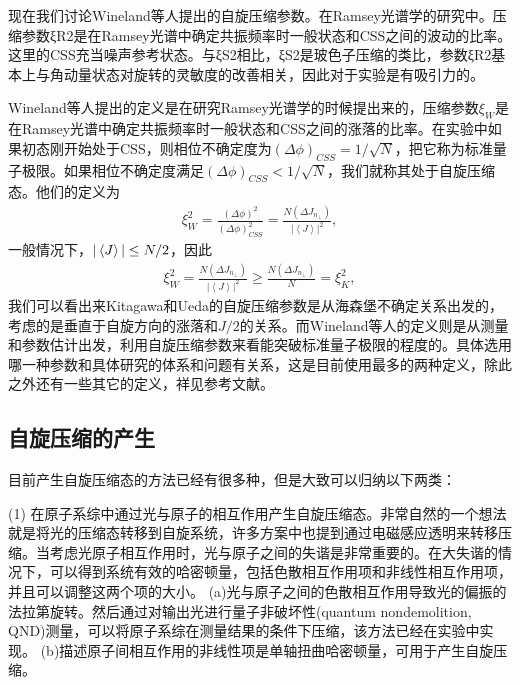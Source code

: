现在我们讨论Wineland等人提出的自旋压缩参数。在Ramsey光谱学的研究中。压缩参数ξR2是在Ramsey光谱中确定共振频率时一般状态和CSS之间的波动的比率。这里的CSS充当噪声参考状态。与ξS2相比，ξS2是玻色子压缩的类比，参数ξR2基本上与角动量状态对旋转的灵敏度的改善相关，因此对于实验是有吸引力的。




Wineland等人提出的定义是在研究Ramsey光谱学的时候提出来的，压缩参数$\xi_W$是在Ramsey光谱中确定共振频率时一般状态和CSS之间的涨落的比率。在实验中如果初态刚开始处于CSS，则相位不确定度为${\left( {\Delta \phi } \right)_{CSS}} = {1 / {\sqrt N }}$，把它称为标准量子极限。如果相位不确定度满足${\left( {\Delta \phi } \right)_{CSS}} <{1 / {\sqrt N }}$，我们就称其处于自旋压缩态。他们的定义为
\begin{align}
	\xi _W^2 = \frac{{{{\left( {\Delta \phi } \right)}^2}}}{{\left( {\Delta \phi } \right)_{CSS}^2}} = \frac{{N\left( {\Delta {J_{{n_ \bot }}}} \right)}}{{{{\left| {\left\langle J \right\rangle } \right|}^2}}},\label{eq3334}
\end{align}
一般情况下，$|\braket{J}| \le  N/2$，因此	
\begin{align}
	\xi _W^2 = \frac{{N\left( {\Delta {J_{{n_ \bot }}}} \right)}}{{{{\left| {\left\langle J \right\rangle } \right|}^2}}} \ge \frac{{N\left( {\Delta {J_{{n_ \bot }}}} \right)}}{N} = \xi _K^2,\label{eq3335}
\end{align}
我们可以看出来Kitagawa和Ueda的自旋压缩参数是从海森堡不确定关系出发的，考虑的是垂直于自旋方向的涨落和$J/2$的关系。而Wineland等人的定义则是从测量和参数估计出发，利用自旋压缩参数来看能突破标准量子极限的程度的。具体选用哪一种参数和具体研究的体系和问题有关系，这是目前使用最多的两种定义，除此之外还有一些其它的定义，祥见参考文献\cite{MA201189}。
\subsection{自旋压缩的产生}	

目前产生自旋压缩态的方法已经有很多种，但是大致可以归纳以下两类：

(1) 在原子系综中通过光与原子的相互作用产生自旋压缩态。非常自然的一个想法就是将光的压缩态转移到自旋系统，许多方案中也提到通过电磁感应透明来转移压缩。当考虑光原子相互作用时，光与原子之间的失谐是非常重要的。在大失谐的情况下，可以得到系统有效的哈密顿量，包括色散相互作用项和非线性相互作用项，并且可以调整这两个项的大小。  
  (a)光与原子之间的色散相互作用导致光的偏振的法拉第旋转。然后通过对输出光进行量子非破坏性(quantum nondemolition, QND)测量，可以将原子系综在测量结果的条件下压缩，该方法已经在实验中实现。  
  (b)描述原子间相互作用的非线性项是单轴扭曲哈密顿量，可用于产生自旋压缩。

